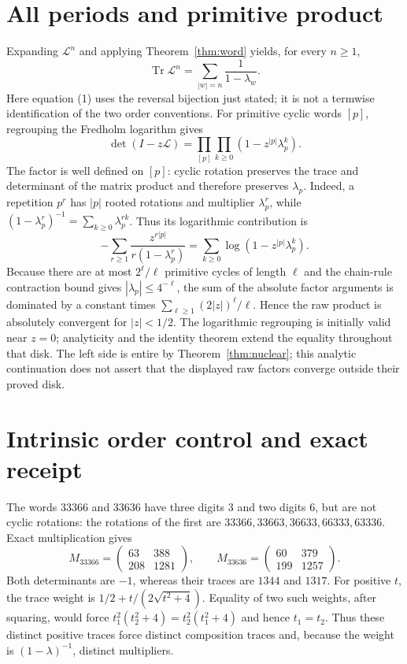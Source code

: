 \documentclass[11pt]{article}
\newcommand{\Lop}{\mathcal L}
\begin{document}
\section{All periods and primitive product}

Expanding $\Lop^n$ and applying Theorem~\ref{thm:word} yields, for every
$n\ge1$,
\begin{equation}
 \operatorname{Tr}\Lop^n=\sum_{|w|=n}\frac1{1-\lambda_w}. \tag{1}
\end{equation}
Here equation (1) uses the reversal bijection just stated; it is not a
termwise identification of the two order conventions.
For primitive cyclic words $[p]$, regrouping the Fredholm logarithm gives
\begin{equation}
 \det(I-z\Lop)=\prod_{[p]}\prod_{k\ge0}
 (1-z^{|p|}\lambda_p^k). \tag{2}
\end{equation}
The factor is well defined on $[p]$: cyclic rotation preserves the trace and
determinant of the matrix product and therefore preserves $\lambda_p$.
Indeed, a repetition $p^r$ has $|p|$ rooted rotations and multiplier
$\lambda_p^r$, while
$(1-\lambda_p^r)^{-1}=\sum_{k\ge0}\lambda_p^{rk}$.
Thus its logarithmic contribution is
\[
 -\sum_{r\ge1}\frac{z^{r|p|}}{r(1-\lambda_p^r)}
 =\sum_{k\ge0}\log(1-z^{|p|}\lambda_p^k).
\]
Because there are at most $2^\ell/\ell$ primitive cycles of length $\ell$
and the chain-rule contraction bound gives $|\lambda_p|\le4^{-\ell}$,
the sum of the absolute factor arguments is dominated by a constant times
$\sum_{\ell\ge1}(2|z|)^\ell/\ell$.  Hence the raw product is absolutely
convergent for $|z|<1/2$.  The logarithmic regrouping is initially valid near
$z=0$; analyticity and the identity theorem extend the equality throughout
that disk.  The left side is entire by
Theorem~\ref{thm:nuclear}; this analytic continuation does not assert that the
displayed raw factors converge outside their proved disk.

\section{Intrinsic order control and exact receipt}

The words $33366$ and $33636$ have three digits $3$ and two digits $6$, but
are not cyclic rotations: the rotations of the first are
$33366,33663,36633,66333,63336$.  Exact multiplication gives
\[
 M_{33366}=\begin{pmatrix}63&388\\208&1281\end{pmatrix},\qquad
 M_{33636}=\begin{pmatrix}60&379\\199&1257\end{pmatrix}.
\]
Both determinants are $-1$, whereas their traces are $1344$ and $1317$.
For positive $t$, the trace weight is
$1/2+t/(2\sqrt{t^2+4})$.  Equality of two such weights, after squaring,
would force $t_1^2(t_2^2+4)=t_2^2(t_1^2+4)$ and hence $t_1=t_2$.
Thus these distinct positive traces force distinct composition traces and,
because the weight is $(1-\lambda)^{-1}$, distinct multipliers.
\end{document}
